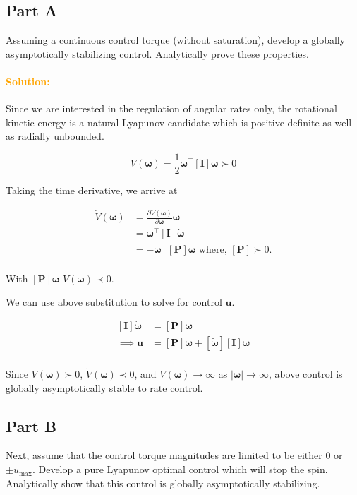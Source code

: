 \documentclass{article}
\begin{document}
\subsection*{Part A}
Assuming a continuous control torque (without saturation), develop a globally asymptotically stabilizing control. Analytically prove these properties.

\paragraph{\textcolor{orange}{Solution:}}
Since we are interested in the regulation of angular rates only, the rotational kinetic energy is a natural Lyapunov candidate which is positive definite as well as radially unbounded.

$$
V(\bm{\omega})=\frac{1}{2}\bm{\omega}^{\intercal}[\bm{I}]\bm{\omega}\succ0
$$

Taking the time derivative, we arrive at

\begin{equation}
  \begin{split}
    \dot{V}(\bm{\omega})&=\frac{\partial V(\bm{\omega})}{\partial\bm{\omega}}\dot{\bm{\omega}}\\
    &=\bm{\omega}^{\intercal}[\bm{I}]\dot{\bm{\omega}}\\
    &=-\bm{\omega}^{\intercal}[\bm{P}]\bm{\omega}\text{ where, }[\bm{P}]\succ0.\\
  \end{split}
\end{equation}

With $[\bm{P}]\bm{\omega}$ $\dot{V}(\bm{\omega})\prec0$.

We can use above substitution to solve for control $\bm{u}$.

\begin{equation}
  \label{eqn_detumble_control_law}
  \begin{split}
    [\bm{I}]\dot{\bm{\omega}}&=[\bm{P}]\bm{\omega}\\ 
    \implies\bm{u}&=[\bm{P}]\bm{\omega}+[\tilde{\bm{\omega}}][\bm{I}]\bm{\omega}\\
  \end{split}
\end{equation}

Since $V(\bm{\omega})\succ0$, $\dot{V}(\bm{\omega})\prec0$, and $V(\bm{\omega})\rightarrow\infty$ as $|\bm{\omega}|\rightarrow\infty$, above control is globally asymptotically stable to rate control.

\subsection*{Part B}
Next, assume that the control torque magnitudes are limited to be either 0 or $\pm u_{\text{max}}$.  Develop a pure Lyapunov optimal control which will stop the spin. Analytically show that this control is globally asymptotically stabilizing.
\end{document}
